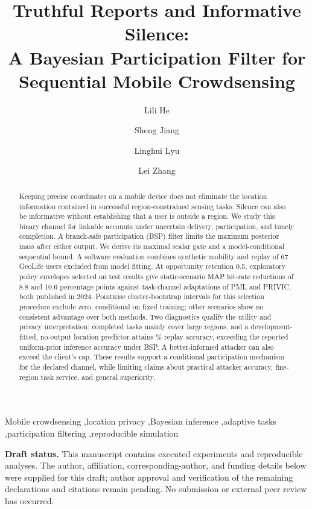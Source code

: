 \documentclass[3p,times]{elsarticle}
\begin{document}
\begin{frontmatter}
\title{Truthful Reports and Informative Silence:\\A Bayesian Participation Filter for Sequential Mobile Crowdsensing}
\author[aff1]{Lili He}
\author[aff1]{Sheng Jiang}
\author[aff1]{Linghui Lyu}
\author[aff1]{Lei Zhang}
\address[aff1]{College of Information and Electronic Technology, Jiamusi University, Jiamusi 154007, China}
\begin{abstract}
Keeping precise coordinates on a mobile device does not eliminate the location information contained in successful region-constrained sensing tasks. Silence can also be informative without establishing that a user is outside a region. We study this binary channel for linkable accounts under uncertain delivery, participation, and timely completion. A branch-safe participation (BSP) filter limits the maximum posterior mass after either output. We derive its maximal scalar gate and a model-conditional sequential bound. A software evaluation combines synthetic mobility and replay of 67 GeoLife users excluded from model fitting. At opportunity retention 0.5, exploratory policy envelopes selected on test results give static-scenario MAP hit-rate reductions of 8.8 and 10.6 percentage points against task-channel adaptations of PML and PRIVIC, both published in 2024. Pointwise cluster-bootstrap intervals for this selection procedure exclude zero, conditional on fixed training; other scenarios show no consistent advantage over both methods. Two diagnostics qualify the utility and privacy interpretation: completed tasks mainly cover large regions, and a development-fitted, no-output location predictor attains \PopulationPriorHit\% replay accuracy, exceeding the reported uniform-prior inference accuracy under BSP. A better-informed attacker can also exceed the client's cap. These results support a conditional participation mechanism for the declared channel, while limiting claims about practical attacker accuracy, fine-region task service, and general superiority.
\end{abstract}
\begin{keyword}
Mobile crowdsensing \sep location privacy \sep Bayesian inference \sep adaptive tasks \sep participation filtering \sep reproducible simulation
\end{keyword}
\end{frontmatter}
\noindent\textbf{Draft status.} This manuscript contains executed experiments and reproducible analyses. The author, affiliation, corresponding-author, and funding details below were supplied for this draft; author approval and verification of the remaining declarations and citations remain pending. No submission or external peer review has occurred.
\end{document}
